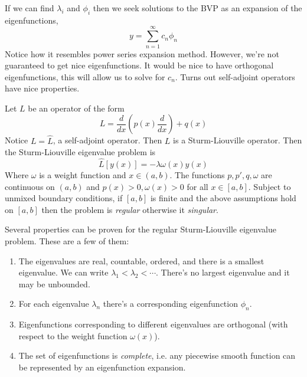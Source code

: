 If we can find $\lambda_i$ and $\phi_i$ then we seek solutions to the BVP as an expansion
of the eigenfunctions,
\[y=\sum_{n=1}^{\infty} c_n\phi_n\]
Notice how it resembles power series expansion method. However, we're not guaranteed to
get nice eigenfunctions. It would be nice to have orthogonal eigenfunctions, this will
allow us to solve for $c_n$. Turns out self-adjoint operators have nice properties.
\begin{definition}
  Let $L$ be an operator of the form
  \[L= \frac{d}{dx}(p(x)\frac{d}{dx}) + q(x)\]
  Notice $L=\hat{L}$, a self-adjoint operator. Then $L$ is a Sturm-Liouville operator.
  Then the Sturm-Liouville eigenvalue problem is 
  \[\hat{L}[y(x)] = -\lambda \omega(x)y(x)\]
  Where $\omega$ is a weight function and $x\in(a,b)$. The functions $p,p',q,\omega$ are
  continuous on $(a,b)$ and $p(x)>0,\omega(x)>0$ for all $x\in[a,b]$.
  Subject to unmixed boundary conditions, if $[a,b]$ is finite and the above assumptions
  hold on $[a,b]$ then the problem is \emph{regular} otherwise it \emph{singular}.
  \label{def:sturmLiouvilleOp}
\end{definition}
Several properties can be proven for the regular Sturm-Liouville eigenvalue problem. These
are a few of them:
\begin{enumerate}
  \item The eigenvalues are real, countable, ordered, and there is a smallest eigenvalue.
    We can write $\lambda_1<\lambda_2<\cdots$. There's no largest eigenvalue and it may be
    unbounded.
  \item For each eigenvalue $\lambda_n$ there's a corresponding eigenfunction $\phi_n$.
  \item Eigenfunctions corresponding to different eigenvalues are orthogonal (with respect
    to the weight function $\omega(x)$).
  \item The set of eigenfunctions is \emph{complete}, i.e. any piecewise smooth function
    can be represented by an eigenfunction expansion.
\end{enumerate}

